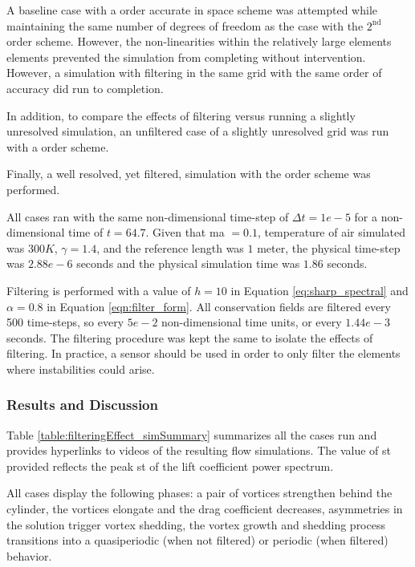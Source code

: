 A baseline case with a  order accurate in space scheme was attempted while maintaining the same number of degrees of freedom as the case with the $2^{\mathrm{nd}}$ order scheme. However, the non-linearities within the relatively large elements elements prevented the simulation from completing without intervention. However, a simulation with filtering in the same grid with the same order of accuracy did run to completion.

In addition, to compare the effects of filtering versus running a slightly unresolved simulation, an unfiltered case of a slightly unresolved grid was run with a  order scheme.

Finally, a well resolved, yet filtered, simulation with the  order scheme was performed.

All cases ran with the same non-dimensional time-step of $\Delta t = 1e-5$ for a non-dimensional time of $t = 64.7$. Given that \gls{ma} $=0.1$, temperature of air simulated was $300K$, $\gamma = 1.4$, and the reference length was $1$ meter, the physical time-step was $2.88e-6$ seconds and the physical simulation time was $1.86$ seconds.

Filtering is performed with a value of $h = 10$ in Equation \eqref{eq:sharp_spectral} and $\alpha = 0.8$ in Equation \eqref{eqn:filter_form}. All conservation fields are filtered every 500 time-steps, so every $5e-2$ non-dimensional time units, or every $1.44e-3$ seconds. The filtering procedure was kept the same to isolate the effects of filtering. In practice, a sensor should be used in order to only filter the elements where instabilities could arise.


\subsubsection{Results and Discussion}
\label{sec:filterEffectsResults}

Table \ref{table:filteringEffect_simSummary} summarizes all the cases run and provides hyperlinks to videos of the resulting flow simulations. The value of \gls{st} provided reflects the peak \gls{st} of the lift coefficient power spectrum.

All cases display the following phases: a pair of vortices strengthen behind the cylinder, the vortices elongate and the drag coefficient decreases, asymmetries in the solution trigger vortex shedding, the vortex growth and shedding process transitions into a quasiperiodic (when not filtered) or periodic (when filtered) behavior.

